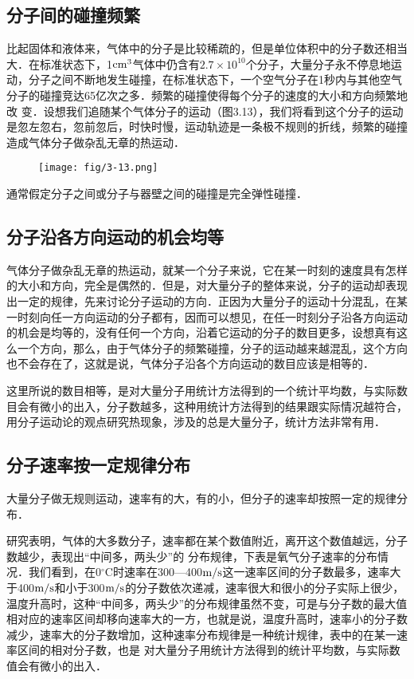 \subsection{分子间的碰撞频繁} 
比起固体和液体来，气体中的分子是比较稀疏的，但是单位体积中的分子数还相当大．在标准状态下，1${\rm cm^3}$气体中仍含有$2.7\times 10^{10}$个分子，大量分子永不停息地运动，分子之间不断地发生碰撞，在标准状态下，一个空气分子在1秒内与其他空气分子的碰撞竞达65亿次之多．频繁的碰撞使得每个分子的速度的大小和方向频繁地改 
变．设想我们追随某个气体分子的运动（图3.13），我们将看到这个分子的运动是忽左忽右，忽前忽后，时快时慢，运动轨迹是一条极不规则的折线，频繁的碰撞造成气体分子做杂乱无章的热运动．
\begin{figure}[htp]\centering
\texttt{[image: fig/3-13.png]}
\caption{}
\end{figure}

通常假定分子之间或分子与器壁之间的碰撞是完全弹性碰撞．

\subsection{分子沿各方向运动的机会均等} 

气体分子做杂乱无章的热运动，就某一个分子来说，它在某一时刻的速度具有怎样的大小和方向，完全是偶然的．但是，对大量分子的整体来说，分子的运动却表现出一定的规律，先来讨论分子运动的方向．正因为大量分子的运动十分混乱，在某一时刻向任一方向运动的分子都有，因而可以想见，在任一时刻分子沿各方向运动的机会是均等的，没有任何一个方向，沿着它运动的分子的数目更多，设想真有这么一个方向，那么，由于气体分子的频繁碰撞，分子的运动越来越混乱，这个方向也不会存在了，这就是说，气体分子沿各个方向运动的数目应该是相等的．

这里所说的数目相等，是对大量分子用统计方法得到的一个统计平均数，与实际数目会有微小的出入，分子数越多，这种用统计方法得到的结果跟实际情况越符合，用分子运动论的观点研究热现象，涉及的总是大量分子，统计方法非常有用．

\subsection{分子速率按一定规律分布} 
大量分子做无规则运动，速率有的大，有的小，但分子的速率却按照一定的规律分布．

研究表明，气体的大多数分子，速率都在某个数值附近，离开这个数值越远，分子数越少，表现出“中间多，两头少”的
分布规律，下表是氧气分子速率的分布情况．我们看到，在0$^\circ$C时速率在300—400$\text{m}/\text{s}$这一速率区间的分子数最多，速率大于400$\text{m}/\text{s}$和小于300$\text{m}/\text{s}$的分子数依次递减，速率很大和很小的分子实际上很少，温度升高时，这种“中间多，两头少”的分布规律虽然不变，可是与分子数的最大值相对应的速率区间却移向速率大的一方，也就是说，温度升高时，速率小的分子数减少，速率大的分子数增加，这种速率分布规律是一种统计规律，表中的在某一速率区间的相对分子数，也是
对大量分子用统计方法得到的统计平均数，与实际数值会有微小的出入．

